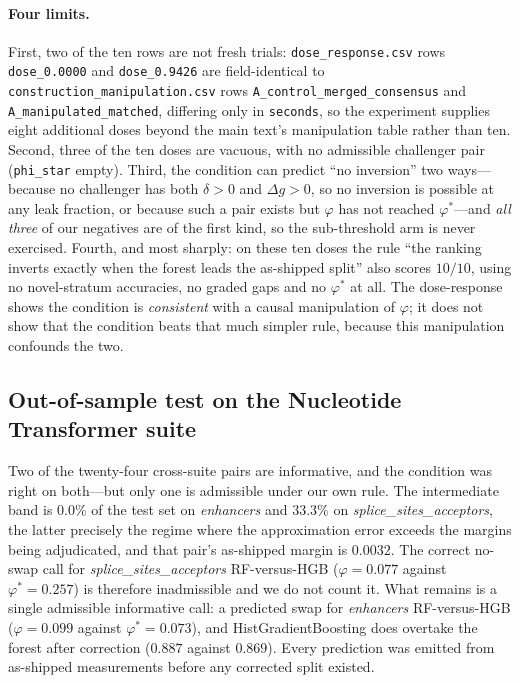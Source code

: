 \documentclass[11pt,a4paper]{article}
\begin{document}
\paragraph{Four limits.} First, two of the ten rows are not fresh trials:
\texttt{dose\_response.csv} rows \texttt{dose\_0.0000} and \texttt{dose\_0.9426} are field-identical
to \texttt{construction\_manipulation.csv} rows \texttt{A\_control\_merged\_consensus} and
\texttt{A\_manipulated\_matched}, differing only in \texttt{seconds}, so the experiment supplies
eight additional doses beyond the main text's manipulation table rather than ten. Second, three of
the ten doses are vacuous, with no admissible challenger pair (\texttt{phi\_star} empty). Third, the
condition can predict ``no inversion'' two ways---because no challenger has both $\delta>0$ and
$\Delta g>0$, so no inversion is possible at any leak fraction, or because such a pair exists but
$\varphi$ has not reached $\varphi^{*}$---and \emph{all three} of our negatives are of the first
kind, so the sub-threshold arm is never exercised. Fourth, and most sharply: on these ten doses the
rule ``the ranking inverts exactly when the forest leads the as-shipped split'' also scores $10/10$,
using no novel-stratum accuracies, no graded gaps and no $\varphi^{*}$ at all. The dose-response
shows the condition is \emph{consistent} with a causal manipulation of $\varphi$; it does not show
that the condition beats that much simpler rule, because this manipulation confounds the two.

\subsection{Out-of-sample test on the Nucleotide Transformer suite}\label{sec:s-phi-oos}
Two of the twenty-four cross-suite pairs are informative, and the condition was right on both---but
only one is admissible under our own rule. The intermediate band is $0.0\%$ of the test set on
\textit{enhancers} and $33.3\%$ on \textit{splice\_sites\_acceptors}, the latter precisely the
regime where the approximation error exceeds the margins being adjudicated, and that pair's
as-shipped margin is $0.0032$. The correct no-swap call for \textit{splice\_sites\_acceptors}
RF-versus-HGB ($\varphi=0.077$ against $\varphi^{*}=0.257$) is therefore inadmissible and we do not
count it. What remains is a single admissible informative call: a predicted swap for
\textit{enhancers} RF-versus-HGB ($\varphi=0.099$ against $\varphi^{*}=0.073$), and
HistGradientBoosting does overtake the forest after correction ($0.887$ against $0.869$). Every
prediction was emitted from as-shipped measurements before any corrected split existed.
\end{document}
